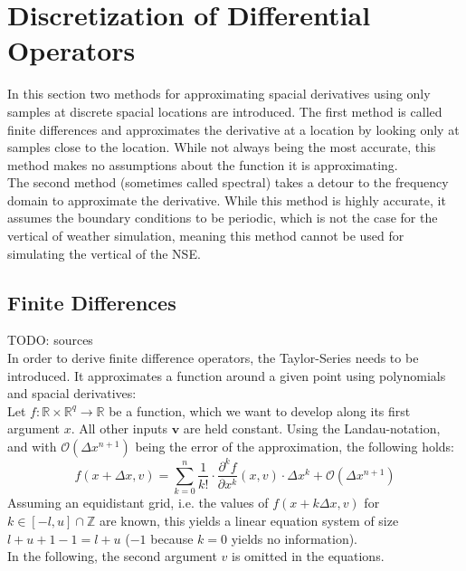 \section{Discretization of Differential Operators}\label{section:diff_op}
In this section two methods for approximating spacial derivatives using only samples at discrete spacial locations are introduced.
The first method is called finite differences and approximates the derivative at a location by looking only at samples close to the location.
While not always being the most accurate, this method makes no assumptions about the function it is approximating.\\
The second method (sometimes called spectral) takes a detour to the frequency domain to approximate the derivative.
While this method is highly accurate, it assumes the boundary conditions to be periodic, which is not the case for the vertical of weather simulation, meaning this method cannot be used for simulating the vertical of the NSE.

\subsection{Finite Differences}
TODO: sources\\
In order to derive finite difference operators, the Taylor-Series needs to be introduced.
It approximates a function around a given point using polynomials and spacial derivatives:\\
Let $f:\mathbb{R}\times\mathbb{R}^q\rightarrow \mathbb{R}$ be a function, which we want to develop along its first argument $x$.
All other inputs $\boldsymbol{v}$ are held constant.
Using the Landau-notation, and with $\mathcal{O}(\Delta x ^{n+1})$ being the error of the approximation, the following holds:
\begin{equation}
f(x+\Delta x,v) = \sum_{k=0}^{n}\frac{1}{k!}\cdot\frac{\partial^k f}{\partial x ^k}(x,v)\cdot \Delta x^k + \mathcal{O}(\Delta x ^{n+1})
\end{equation}
Assuming an equidistant grid, i.e. the values of $f(x+k\Delta x,v)$ for $k\in [-l,u] \cap \mathbb{Z}$ are known, this yields a linear equation system of size $l + u + 1 - 1= l + u$ ($-1$ because $k=0$ yields no information).\\
In the following, the second argument $v$ is omitted in the equations.


